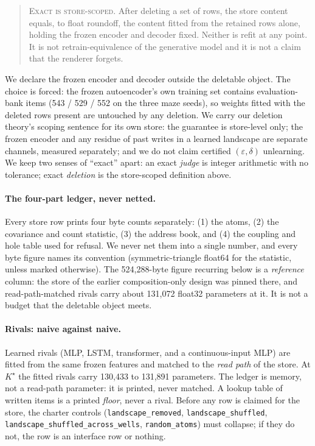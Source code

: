 \documentclass{article} %
\newcommand{\Kstar}{\ensuremath{K^{\star}}}
\begin{document}
\begin{quote}\small
\textsc{Exact is store-scoped.} After deleting a set of rows, the store content equals, to
float roundoff, the content fitted from the retained rows alone, holding the frozen encoder and
decoder fixed. Neither is refit at any point. It is not retrain-equivalence of the generative
model and it is not a claim that the renderer forgets.
\end{quote}

\noindent We declare the frozen encoder and decoder outside the deletable object. The choice
is forced: the frozen autoencoder's own training set contains evaluation-bank items
(543 / 529 / 552 on the three maze seeds), so weights fitted with the deleted rows present are untouched by any deletion. %
We carry our deletion theory's scoping sentence for its own store: the guarantee
is store-level only; the frozen encoder and any residue of past writes in a learned
landscape are separate channels, measured separately; and we do not claim certified
$(\varepsilon,\delta)$ unlearning. %
We keep two senses of ``exact'' apart: an exact \emph{judge} is integer arithmetic with no
tolerance; exact \emph{deletion} is the store-scoped definition above.

\paragraph{The four-part ledger, never netted.} Every store row prints four byte counts
separately: (1) the atoms, (2) the covariance and count statistic, (3) the address book, and
(4) the coupling and hole table used for refusal.
We never net them into a single number, and every byte figure names its convention
(symmetric-triangle float64 for the statistic, unless marked otherwise). The 524,288-byte figure
recurring below is a \emph{reference} column: the store of the earlier composition-only design
was pinned there, and read-path-matched rivals carry about 131,072 float32 parameters at it. %
It is not a budget that the deletable object meets.

\paragraph{Rivals: naive against naive.} Learned rivals (MLP, LSTM, transformer, and a
continuous-input MLP) are fitted from the same frozen features and matched to the
\emph{read path} of the store. At $\Kstar$ the fitted rivals carry 130,433 to 131,891 parameters.
The ledger is memory, not a read-path parameter: it is printed, never matched. A lookup table
of written items is a printed \emph{floor}, never a rival. Before any row is claimed for the
store, the charter controls (\texttt{landscape\_removed}, \texttt{landscape\_shuffled},
\texttt{landscape\_shuffled\_across\_wells}, \texttt{random\_atoms}) must collapse; if they do
not, the row is an interface row or nothing.
\end{document}
